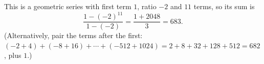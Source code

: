 This is a geometric series with first term $1$, ratio $-2$ and $11$ terms, so its sum is
\[\dfrac{1-(-2)^{11}}{1-(-2)}=\dfrac{1+2048}{3}=\boxed{683}.\]
(Alternatively, pair the terms after the first: $(-2+4)+(-8+16)+\cdots+(-512+1024)=2+8+32+128+512=682$, plus $1$.)
